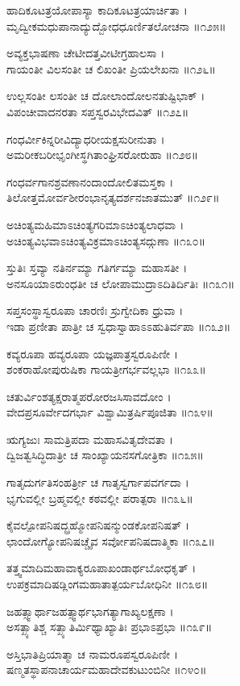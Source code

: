 ಹಾದಿಕೂಟತ್ರಯೋಪಾಸ್ಯಾ ಕಾದಿಕೂಟತ್ರಯಾರ್ಚಿತಾ ।\\
ಮೃದ್ವೀಕಮಧುಪಾನಾದ್ಯುದ್ಬೋಧಧೂರ್ಣಿತಲೋಚನಾ ॥೧೨೫॥

ಅವ್ಯಕ್ತಭಾಷಣಾ ಚೇಟೀದತ್ತವೀಟೀಗ್ರಹಾಲಸಾ ।\\
ಗಾಯಂತೀ ವಿಲಸಂತೀ ಚ ಲಿಖಂತೀ ಪ್ರಿಯಲೇಖನಾ ॥೧೨೬॥

ಉಲ್ಲಸಂತೀ ಲಸಂತೀ ಚ ದೋಲಾಂದೋಲನತುಷ್ಟಿಭಾಕ್ ।\\
ವಿಪಂಚೀವಾದನರತಾ ಸಪ್ತಸ್ವರವಿಭೇದವಿತ್ ॥೧೨೭॥

ಗಂಧರ್ವೀಕಿನ್ನರೀವಿದ್ಯಾಧರೀಯಕ್ಷಸುರೀನುತಾ ।\\
ಅಮರೀಕಬರೀಭೃಂಗೀಸ್ಥಗಿತಾಂಘ್ರಿಸರೋರುಹಾ ॥೧೨೮॥

ಗಂಧರ್ವಗಾನಶ್ರವಣಾನಂದಾಂದೋಲಿತಮಸ್ತಕಾ ।\\
ತಿಲೋತ್ತಮೋರ್ವಶೀರಂಭಾನೃತ್ಯದರ್ಶನಜಾತಮುತ್ ॥೧೨೯॥

ಅಚಿಂತ್ಯಮಹಿಮಾಽಚಿಂತ್ಯಗರಿಮಾಽಚಿಂತ್ಯಲಾಧವಾ ।\\
ಅಚಿಂತ್ಯವಿಭವಾಽಚಿಂತ್ಯವಿಕ್ರಮಾಽಚಿಂತ್ಯಸದ್ಗುಣಾ ॥೧೩೦॥

ಸ್ತುತಿಃ ಸ್ತವ್ಯಾ ನತಿರ್ನಮ್ಯಾ ಗತಿರ್ಗಮ್ಯಾ ಮಹಾಸತೀ ।\\
ಅನಸೂಯಾಽರುಂಧತೀ ಚ ಲೋಪಾಮುದ್ರಾಽದಿತಿರ್ದಿತಿಃ ॥೧೩೧॥

ಸಪ್ತಸಂಸ್ಥಾಸ್ವರೂಪಾ ಚಾರಣಿಃ ಸ್ರುಗ್ವೇದಿಕಾ ಧ್ರುವಾ ।\\
ಇಡಾ ಪ್ರಣೀತಾ ಪಾತ್ರೀ ಚ ಸ್ವಧಾಸ್ವಾಹಾಽಽಹುತಿರ್ವಪಾ ॥೧೩೨॥

ಕವ್ಯರೂಪಾ ಹವ್ಯರೂಪಾ ಯಜ್ಞಪಾತ್ರಸ್ವರೂಪಿಣೀ ।\\
ಶಂಕರಾಹೋಪುರುಷಿಕಾ ಗಾಯತ್ರೀಗರ್ಭವಲ್ಲಭಾ ॥೧೩೩॥

ಚತುರ್ವಿಂಶತ್ಯಕ್ಷರಾತ್ಮಪರೋರಜಸಿಸಾವದೋಂ ।\\
ವೇದಪ್ರಸೂರ್ವೇದಗರ್ಭಾ ವಿಶ್ವಾಮಿತ್ರರ್ಷಿಪೂಜಿತಾ ॥೧೩೪॥

ಋಗ್ಯಜುಃ ಸಾಮತ್ರಿಪದಾ ಮಹಾಸವಿತೃದೇವತಾ ।\\
ದ್ವಿಜತ್ವಸಿದ್ಧಿದಾತ್ರೀ ಚ ಸಾಂಖ್ಯಾಯನಸಗೋತ್ರಿಕಾ ॥೧೩೫॥

ಗಾತೃದುರ್ಗತಿಸಂಹರ್ತ್ರೀ ಚ ಗಾತೃಸ್ವರ್ಗಾಪವರ್ಗದಾ ।\\
ಭೃಗುವಲ್ಲೀ ಬ್ರಹ್ಮವಲ್ಲೀ ಕಠವಲ್ಲೀ ಪರಾತ್ಪರಾ ॥೧೩೬॥

ಕೈವಲ್ಪೋಪನಿಷದ್ಬ್ರಹ್ಮೋಪನಿಷನ್ಮುಂಡಕೋಪನಿಷತ್ ।\\
ಛಾಂದೋಗ್ಯೋಪನಿಷಚ್ಚೈವ ಸರ್ವೋಪನಿಷದಾತ್ಮಿಕಾ ॥೧೩೭॥

ತತ್ತ್ವಮಾದಿಮಹಾವಾಕ್ಯರೂಪಾಖಂಡಾರ್ಥಬೋಧಕೃತ್ ।\\
ಉಪಕ್ರಮಾದಿಷಡ್ಲಿಂಗಮಹಾತಾತ್ಪರ್ಯಬೋಧಿನೀ ॥೧೩೮॥

ಜಹತ್ಸ್ವಾರ್ಥಾಜಹತ್ಸ್ವಾರ್ಥಭಾಗತ್ಯಾಗಾಖ್ಯಲಕ್ಷಣಾ ।\\
ಅಸತ್ಖ್ಯಾತಿಶ್ಚ ಸತ್ಖ್ಯಾತಿರ್ಮಿಥ್ಯಾಖ್ಯಾತಿಃ ಪ್ರಭಾಽಪ್ರಭಾ ॥೧೩೯॥

ಅಸ್ತಿಭಾತಿಪ್ರಿಯಾತ್ಮಾ ಚ ನಾಮರೂಪಸ್ವರೂಪಿಣೀ ।\\
ಷಣ್ಮತಸ್ಥಾಪನಾಚಾರ್ಯಮಹಾದೇವಕುಟುಂಬಿನೀ ॥೧೪೦॥

